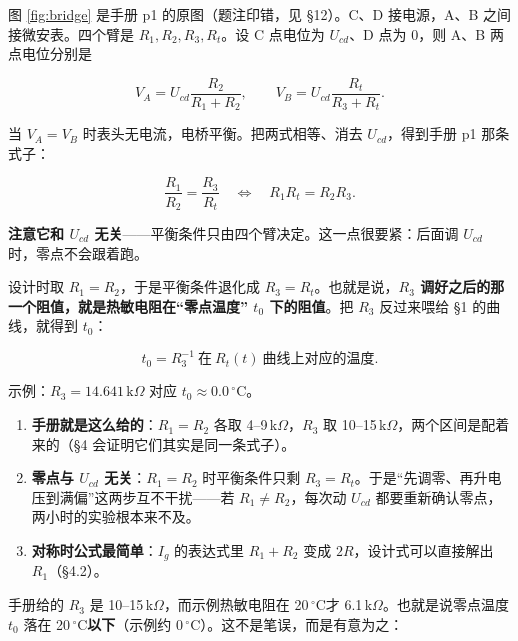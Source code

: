 \documentclass[11pt]{ctexart}
\newcommand{\degC}{\ensuremath{\,^\circ\mathrm{C}}}
\begin{document}



图 \ref{fig:bridge} 是手册 p1 的原图（题注印错，见 §12）。C、D 接电源，A、B 之间接微安表。四个臂是 $R_1,R_2,R_3,R_t$。设 C 点电位为 $U_{cd}$、D 点为 0，则 A、B 两点电位分别是

\[
V_A=U_{cd}\frac{R_2}{R_1+R_2},\qquad V_B=U_{cd}\frac{R_t}{R_3+R_t}.
\]

当 $V_A=V_B$ 时表头无电流，电桥平衡。把两式相等、消去 $U_{cd}$，得到手册 p1 那条式子：

\[
\frac{R_1}{R_2}=\frac{R_3}{R_t}
\quad\Longleftrightarrow\quad
R_1R_t=R_2R_3 .
\]

\textbf{注意它和 $U_{cd}$ 无关}——平衡条件只由四个臂决定。这一点很要紧：后面调 $U_{cd}$ 时，零点不会跟着跑。

设计时取 $R_1=R_2$，于是平衡条件退化成 $R_3=R_t$。也就是说，\textbf{$R_3$ 调好之后的那一个阻值，就是热敏电阻在“零点温度” $t_0$ 下的阻值}。把 $R_3$ 反过来喂给 §1 的曲线，就得到 $t_0$：

\[
t_0=R_3^{-1}\ \text{在}\ R_t(t)\ \text{曲线上对应的温度}.
\]

示例：$R_3=14.641\,\mathrm{k}\Omega$ 对应 $t_0\approx 0.0\degC$。


\begin{enumerate}
\item \textbf{手册就是这么给的}：$R_1=R_2$ 各取 4--9\,k$\Omega$，$R_3$ 取 10--15\,k$\Omega$，两个区间是配着来的（§4 会证明它们其实是同一条式子）。
\item \textbf{零点与 $U_{cd}$ 无关}：$R_1=R_2$ 时平衡条件只剩 $R_3=R_t$。于是“先调零、再升电压到满偏”这两步互不干扰——若 $R_1\ne R_2$，每次动 $U_{cd}$ 都要重新确认零点，两小时的实验根本来不及。
\item \textbf{对称时公式最简单}：$I_g$ 的表达式里 $R_1+R_2$ 变成 $2R$，设计式可以直接解出 $R_1$（§4.2）。
\end{enumerate}


手册给的 $R_3$ 是 10--15\,k$\Omega$，而示例热敏电阻在 20\degC 才 6.1\,k$\Omega$。也就是说零点温度 $t_0$ 落在 20\degC \textbf{以下}（示例约 0\degC）。这不是笔误，而是有意为之：
\end{document}
